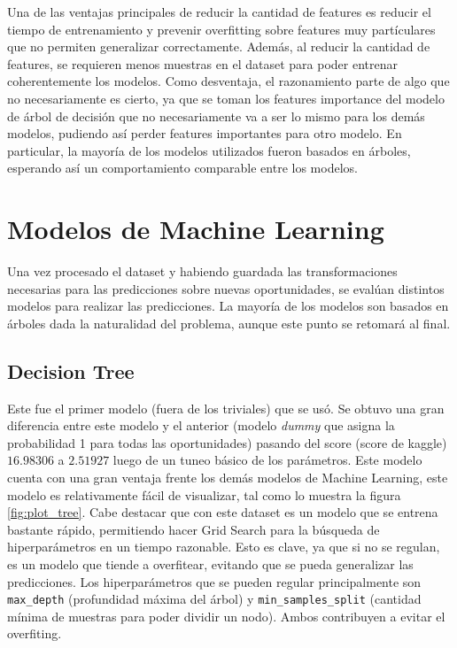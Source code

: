 \documentclass[titlepage,a4paper]{article}
\begin{document}
Una de las ventajas principales de reducir la cantidad de features es reducir el tiempo de entrenamiento y prevenir overfitting sobre features muy partículares que no permiten generalizar correctamente. Además, al reducir la cantidad de features, se requieren menos muestras en el dataset para poder entrenar coherentemente los modelos. Como desventaja, el razonamiento parte de algo que no necesariamente es cierto, ya que se toman los features importance del modelo de árbol de decisión que no necesariamente va a ser lo mismo para los demás modelos, pudiendo así perder features importantes para otro modelo. En particular, la mayoría de los modelos utilizados fueron basados en árboles, esperando así un comportamiento comparable entre los modelos. 

\section{Modelos de Machine Learning}\label{sec:modelos_machine_learning}
Una vez procesado el dataset y habiendo guardada las transformaciones necesarias para las predicciones sobre nuevas oportunidades, se evalúan distintos modelos para realizar las predicciones. La mayoría de los modelos son basados en árboles dada la naturalidad del problema, aunque este punto se retomará al final.

\subsection{Decision Tree}\label{sub:des_tree}
Este fue el primer modelo (fuera de los triviales) que se usó. Se obtuvo una gran diferencia entre este modelo y el anterior (modelo \textit{dummy} que asigna la probabilidad 1 para todas las oportunidades) pasando del score (score de kaggle) $16.98306$ a $2.51927$ luego de un tuneo básico de los parámetros. Este modelo cuenta con una gran ventaja frente los demás modelos de Machine Learning, este modelo es relativamente fácil de visualizar, tal como lo muestra la figura \ref{fig:plot_tree}. Cabe destacar que con este dataset es un modelo que se entrena bastante rápido, permitiendo hacer Grid Search para la búsqueda de hiperparámetros en un tiempo razonable. Esto es clave, ya que si no se regulan, es un modelo que tiende a overfitear, evitando que se pueda generalizar las predicciones. Los hiperparámetros que se pueden regular principalmente son \verb|max_depth| (profundidad máxima del árbol) y \verb|min_samples_split| (cantidad mínima de muestras para poder dividir un nodo). Ambos contribuyen a evitar el overfiting.
\end{document}
